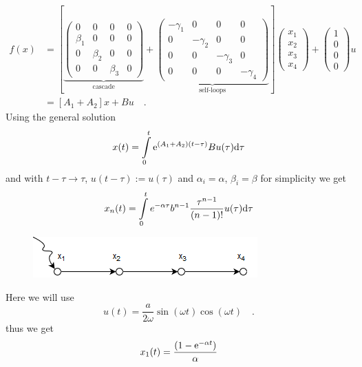 \begin{align}
f(x) &=
\left[ \underbrace{
\begin{pmatrix}
0 & 0 & 0 & 0 \\
\beta_1 & 0 & 0 & 0 \\
 0& \beta_2  & 0 & 0 \\
0& 0 & \beta_3  & 0 
\end{pmatrix} }_\text{cascade}
+
\underbrace{
\begin{pmatrix}
- \gamma_1 & 0 & 0 & 0 \\
0 & - \gamma_2 &0 & 0 \\
0 & 0 & - \gamma_3 & 0 \\
0 & 0 & 0 & - \gamma_4
\end{pmatrix} }_\text{self-loops}
\right]
\begin{pmatrix}
x_1 \\ x_2 \\ x_3 \\ x_4
\end{pmatrix}
+
\begin{pmatrix}
1 \\ 0 \\ 0 \\ 0 
\end{pmatrix}
u \\
&= \left[ A_1 + A_2 \right] x + Bu
\quad .
\end{align}
Using the general solution 
\begin{equation}
x(t) = \int\limits_0^t \text{e}^{(A_1+A_2)(t-\tau)}
B u (\tau) \text{d} \tau
\end{equation}
and with $t- \tau \to \tau  $, $u( t - \tau) := u(\tau)$ and 
$\alpha_i = \alpha$, $\beta_i = \beta$ for simplicity
we get
\begin{equation}
x_n(t) = \int\limits_0^t e^{-\alpha\tau} b^{n-1}\frac{\tau^{n-1}}
{(n-1)!} u(\tau) \text{d} \tau
\end{equation}

\begin{figure}[h]
	\centering
	\includegraphics[scale=0.8]{graphics/cascade1.png}
\end{figure}

Here we will use 
\begin{equation}
u(t) = \frac{a}{2 \omega} \sin(\omega t)\cos(\omega t) \quad .
\end{equation}
thus we get
\begin{align}
x_1(t) = \frac{(1 - \text{e}^{-\alpha t})}{\alpha}  
\end{align}
